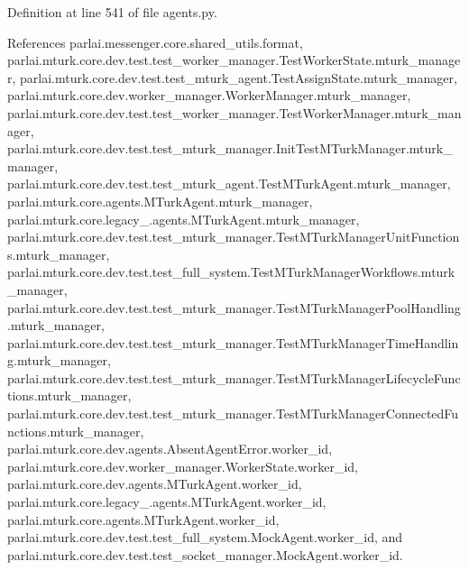 Definition at line 541 of file agents.\+py.



References parlai.\+messenger.\+core.\+shared\+\_\+utils.\+format, parlai.\+mturk.\+core.\+dev.\+test.\+test\+\_\+worker\+\_\+manager.\+Test\+Worker\+State.\+mturk\+\_\+manager, parlai.\+mturk.\+core.\+dev.\+test.\+test\+\_\+mturk\+\_\+agent.\+Test\+Assign\+State.\+mturk\+\_\+manager, parlai.\+mturk.\+core.\+dev.\+worker\+\_\+manager.\+Worker\+Manager.\+mturk\+\_\+manager, parlai.\+mturk.\+core.\+dev.\+test.\+test\+\_\+worker\+\_\+manager.\+Test\+Worker\+Manager.\+mturk\+\_\+manager, parlai.\+mturk.\+core.\+dev.\+test.\+test\+\_\+mturk\+\_\+manager.\+Init\+Test\+M\+Turk\+Manager.\+mturk\+\_\+manager, parlai.\+mturk.\+core.\+dev.\+test.\+test\+\_\+mturk\+\_\+agent.\+Test\+M\+Turk\+Agent.\+mturk\+\_\+manager, parlai.\+mturk.\+core.\+agents.\+M\+Turk\+Agent.\+mturk\+\_\+manager, parlai.\+mturk.\+core.\+legacy\+\_.\+agents.\+M\+Turk\+Agent.\+mturk\+\_\+manager, parlai.\+mturk.\+core.\+dev.\+test.\+test\+\_\+mturk\+\_\+manager.\+Test\+M\+Turk\+Manager\+Unit\+Functions.\+mturk\+\_\+manager, parlai.\+mturk.\+core.\+dev.\+test.\+test\+\_\+full\+\_\+system.\+Test\+M\+Turk\+Manager\+Workflows.\+mturk\+\_\+manager, parlai.\+mturk.\+core.\+dev.\+test.\+test\+\_\+mturk\+\_\+manager.\+Test\+M\+Turk\+Manager\+Pool\+Handling.\+mturk\+\_\+manager, parlai.\+mturk.\+core.\+dev.\+test.\+test\+\_\+mturk\+\_\+manager.\+Test\+M\+Turk\+Manager\+Time\+Handling.\+mturk\+\_\+manager, parlai.\+mturk.\+core.\+dev.\+test.\+test\+\_\+mturk\+\_\+manager.\+Test\+M\+Turk\+Manager\+Lifecycle\+Functions.\+mturk\+\_\+manager, parlai.\+mturk.\+core.\+dev.\+test.\+test\+\_\+mturk\+\_\+manager.\+Test\+M\+Turk\+Manager\+Connected\+Functions.\+mturk\+\_\+manager, parlai.\+mturk.\+core.\+dev.\+agents.\+Absent\+Agent\+Error.\+worker\+\_\+id, parlai.\+mturk.\+core.\+dev.\+worker\+\_\+manager.\+Worker\+State.\+worker\+\_\+id, parlai.\+mturk.\+core.\+dev.\+agents.\+M\+Turk\+Agent.\+worker\+\_\+id, parlai.\+mturk.\+core.\+legacy\+\_.\+agents.\+M\+Turk\+Agent.\+worker\+\_\+id, parlai.\+mturk.\+core.\+agents.\+M\+Turk\+Agent.\+worker\+\_\+id, parlai.\+mturk.\+core.\+dev.\+test.\+test\+\_\+full\+\_\+system.\+Mock\+Agent.\+worker\+\_\+id, and parlai.\+mturk.\+core.\+dev.\+test.\+test\+\_\+socket\+\_\+manager.\+Mock\+Agent.\+worker\+\_\+id.

\mbox{\label{classparlai_1_1mturk_1_1core_1_1legacy__2018_1_1agents_1_1MTurkAgent_ab989adcb9b0f2c2cdb3ec43445ea660c}} 
